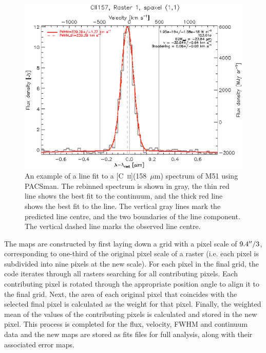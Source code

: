 \begin{figure}[!h]
 \begin{center}
 \includegraphics[width=\columnwidth]{ch1/M51_raster1_11.eps}
  \caption[Best line fit to a spaxel from PACS \mbox{[C~\textsc{ii}](158~$\mu$m)} observations of M51]{An example of a line fit to a [C~\textsc{ii}](158~$\mu$m) spectrum of M51 using PACSman.  The rebinned spectrum is shown in gray, the thin red line shows the best fit to the continuum, and the thick red line shows the best fit to the line.  The vertical gray lines mark the predicted line centre, and the two boundaries of the line component.  The vertical dashed line marks the observed line centre.
  \label{fig:spectrum}}
 \end{center}
\end{figure}

The maps are constructed by first laying down a grid with a pixel scale of $9.4 \mbox{$^{\prime\prime}$} /3$, corresponding to one-third of the original pixel scale of a raster (i.e. each pixel is subdivided into nine pixels at the new scale).  For each pixel in the final grid, the code iterates through all rasters searching for all contributing pixels.  Each contributing pixel is rotated through the appropriate position angle to align it to the final grid.  Next, the area of each original pixel that coincides with the selected final pixel is calculated as the weight for that pixel.  Finally, the weighted mean of the values of the contributing pixels is calculated and stored in the new pixel.  This process is completed for the flux, velocity, FWHM and continuum data and the new maps are stored as fits files for full analysis, along with their associated error maps.

